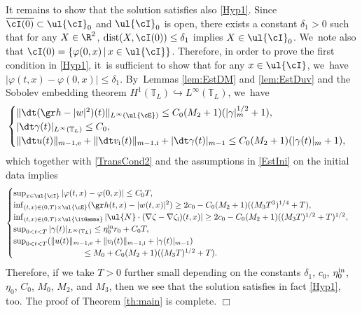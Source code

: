 It remains to show that the solution satisfies also \eqref{Hyp1}.
Since $\overline{\cI(0)} \subset \ul{\cI}_0$ and $\ul{\cI}_0$ is open, there exists a constant $\delta_1>0$ such that for any $X\in\R^2$,
$\operatorname{dist}(X,\cI(0))\leq\delta_1$ implies $X\in\ul{\cI}_0$. We~note also that $\cI(0)=\{ \varphi(0,x) \,|\, x\in\ul{\cI} \}$.
Therefore, in order to prove the first condition in \eqref{Hyp1}, it~is sufficient to show that for any $x\in\ul{\cI}$, we~have $|\varphi(t,x)-\varphi(0,x)|\leq\delta_1$. By~Lemmas \ref{lem:EstDM} and \ref{lem:EstDuv} and the Sobolev embedding theorem $H^1(\mathbb{T}_L) \hookrightarrow L^\infty(\mathbb{T}_L)$, we~have
\[
\begin{cases}
\|\dt(\gr h-|w|^2)(t)\|_{L^\infty(\ul{\cE})} \leq C_0(M_2+1)(|\gamma|_m^{1/2}+1), \\
|\dt\gamma(t)|_{L^\infty(\mathbb{T}_L)} \leq C_0, \\
\|\dt u(t)\|_{m-1,{\rm e}}+\|\dt v_\mathrm{i}(t)\|_{m-1,{\rm i}}+|\dt\gamma(t)|_{m-1} \leq C_0(M_2+1)(|\gamma(t)|_m+1),
\end{cases}
\]
which together with \eqref{TransCond2} and the assumptions in \eqref{EstIni} on the initial data implies
\[
\begin{cases}
\sup_{x\in\ul{\cI}}|\varphi(t,x)-\varphi(0,x)| \leq C_0T, \\
\inf_{(t,x)\in(0,T)\times\ul{\cE}}(\gr h(t,x)-|w(t,x)|^2) \geq 2c_0 - C_0(M_2+1)((M_3T^3)^{1/4}+T), \\
\inf_{(t,x)\in(0,T)\times\ul{\itGamma}}| \ul{N}\cdot(\nabla\zeta-\nabla\zeta_\mathrm{i})(t,x)| \geq 2c_0 - C_0(M_2+1)((M_3T)^{1/2}+T)^{1/2}, \\
\sup_{0<t<T}|\gamma(t)|_{L^\infty(\mathbb{T}_L)} \leq \eta_0^{\rm in}r_0 + C_0T, \\
\sup_{0<t<T}(\|u(t)\|_{m-1,{\rm e}} + \|v_\mathrm{i}(t)\|_{m-1,{\rm i}} + |\gamma(t)|_{m-1}) \\
\hspace{3cm}\leq M_0 + C_0(M_2+1)((M_3T)^{1/2}+T).
\end{cases}
\]
Therefore, if we take $T>0$ further small depending on the constants $\delta_1$, $c_0$, $\eta_0^{\rm in}$, $\eta_0$, $C_0$, $M_0$, $M_2$, and $M_3$,
then we see that the solution satisfies in fact \eqref{Hyp1}, too.
The proof of Theorem \ref{th:main} is complete.
\hfill$\Box$
